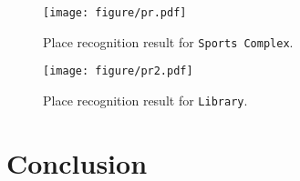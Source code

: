 


\begin{figure}[!t]
    \centering
    \texttt{[image: figure/pr.pdf]}
    \caption{Place recognition result for \texttt{Sports Complex}.}
    \label{fig:pr}
    \vspace{-3mm}
\end{figure}

\begin{figure}[!t]
    \centering
    \texttt{[image: figure/pr2.pdf]}
    \caption{Place recognition result for \texttt{Library}.}
    \label{fig:pr2}
    \vspace{-5mm}
\end{figure}


\section{Conclusion}
\label{sec:conclusion}

